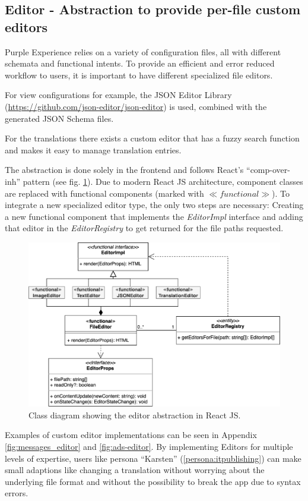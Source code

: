 \subsection{Editor - Abstraction to provide per-file custom editors}

Purple Experience relies on a variety of configuration files, all with different schemata and functional intents.
To provide an efficient and error reduced workflow to users, it is important to have different specialized file editors.

For view configurations for example, the JSON Editor Library (\url{https://github.com/json-editor/json-editor}) is used, combined with the generated JSON Schema files.

For the translations there exists a custom editor that has a fuzzy search function and makes it easy to manage translation entries.

The abstraction is done solely in the frontend and follows React's ``\Gls{comp-over-inh}'' pattern (see fig. \ref{fig:abstract-editor}). Due to modern React JS architecture, component classes are replaced with functional components (marked with $\ll functional\gg$).
To integrate a new specialized editor type, the only two steps are necessary:
Creating a new functional component that implements the \textit{EditorImpl} interface
and adding that editor in the \textit{EditorRegistry} to get returned for the file paths requested.
\begin{figure}[h!]
  \includegraphics[width=\textwidth]{pics/abstract_editor_uml.drawio.png}
  \caption{Class diagram showing the editor abstraction in React JS.}
  \label{fig:abstract-editor}
\end{figure}
Examples of custom editor implementations can be seen in Appendix \ref{fig:messages_editor} and \ref{fig:ads-editor}.
By implementing Editors for multiple levels of expertise, users like persona ``Karsten'' (\ref{persona:itpublishing}) can make small adaptions like changing a translation without worrying about the underlying file format and without the possibility to break the app due to syntax errors.

